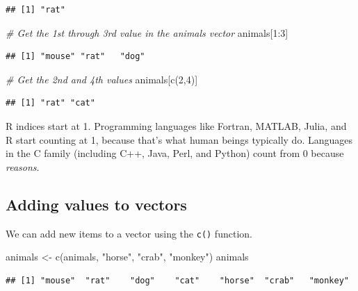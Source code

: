 \documentclass[
]{book}
\newenvironment{Shaded}{\begin{snugshade}}{\end{snugshade}}
\newcommand{\CommentTok}[1]{\textcolor[rgb]{0.56,0.35,0.01}{\textit{#1}}}
\newcommand{\DecValTok}[1]{\textcolor[rgb]{0.00,0.00,0.81}{#1}}
\newcommand{\FunctionTok}[1]{\textcolor[rgb]{0.00,0.00,0.00}{#1}}
\newcommand{\NormalTok}[1]{#1}
\newcommand{\OtherTok}[1]{\textcolor[rgb]{0.56,0.35,0.01}{#1}}
\newcommand{\SpecialCharTok}[1]{\textcolor[rgb]{0.00,0.00,0.00}{#1}}
\newcommand{\StringTok}[1]{\textcolor[rgb]{0.31,0.60,0.02}{#1}}
\begin{document}
\begin{verbatim}
## [1] "rat"
\end{verbatim}

\begin{Shaded}
\begin{Highlighting}[]
\CommentTok{\# Get the 1st through 3rd value in the animals vector}
\NormalTok{animals[}\DecValTok{1}\SpecialCharTok{:}\DecValTok{3}\NormalTok{]}
\end{Highlighting}
\end{Shaded}

\begin{verbatim}
## [1] "mouse" "rat"   "dog"
\end{verbatim}

\begin{Shaded}
\begin{Highlighting}[]
\CommentTok{\# Get the 2nd and 4th values}
\NormalTok{animals[}\FunctionTok{c}\NormalTok{(}\DecValTok{2}\NormalTok{,}\DecValTok{4}\NormalTok{)]}
\end{Highlighting}
\end{Shaded}

\begin{verbatim}
## [1] "rat" "cat"
\end{verbatim}

R indices start at 1. Programming languages like Fortran, MATLAB, Julia, and R start counting at 1, because that's what human beings typically do. Languages in the C family (including C++, Java, Perl, and Python) count from 0 because \emph{reasons}.

\hypertarget{adding-values-to-vectors}{%
\subsection*{Adding values to vectors}\label{adding-values-to-vectors}}

We can add new items to a vector using the \texttt{c()} function.

\begin{Shaded}
\begin{Highlighting}[]
\NormalTok{animals }\OtherTok{\textless{}{-}} \FunctionTok{c}\NormalTok{(animals, }\StringTok{"horse"}\NormalTok{, }\StringTok{"crab"}\NormalTok{, }\StringTok{"monkey"}\NormalTok{)}
\NormalTok{animals}
\end{Highlighting}
\end{Shaded}

\begin{verbatim}
## [1] "mouse"  "rat"    "dog"    "cat"    "horse"  "crab"   "monkey"
\end{verbatim}
\end{document}
